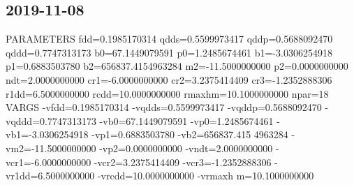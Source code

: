 \documentclass[11pt]{article}
\begin{document}
\subsection{2019-11-08}
\label{sec:org14d609d}
PARAMETERS
  fdd=0.1985170314 qdds=0.5599973417 qddp=0.5688092470 qddd=0.7747313173 b0=67.1449079591 p0=1.2485674461 b1=-3.0306254918 p1=0.6883503780 b2=656837.4154963284 m2=-11.5000000000 p2=0.0000000000 ndt=2.0000000000 cr1=-6.0000000000 cr2=3.2375414409 cr3=-1.2352888306 r1dd=6.5000000000 rcdd=10.0000000000 rmaxhm=10.1000000000 npar=18 
VARGS
    -vfdd=0.1985170314 -vqdds=0.5599973417 -vqddp=0.5688092470 -vqddd=0.7747313173 -vb0=67.1449079591 -vp0=1.2485674461 -vb1=-3.0306254918 -vp1=0.6883503780 -vb2=656837.415
4963284 -vm2=-11.5000000000 -vp2=0.0000000000 -vndt=2.0000000000 -vcr1=-6.0000000000 -vcr2=3.2375414409 -vcr3=-1.2352888306 -vr1dd=6.5000000000 -vrcdd=10.0000000000 -vrmaxh
m=10.1000000000 
\end{document}
